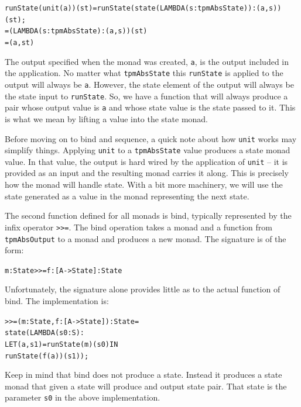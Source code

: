 \documentclass[10pt]{article}
\begin{document}
\begin{alltt}
  runState(unit(a))(st) = runState(state(LAMBDA (s:tpmAbsState)) :  (a,s))(st);
                        = (LAMBDA (s:tpmAbsState) : (a,s))(st)
                        = (a,st)
\end{alltt}

The output specified when the monad was created, \verb!a!, is the
output included in the application.  No matter what \verb!tpmAbsState!
this \verb!runState! is applied to the output will always be
\verb!a!.  However, the state element of the output will always be the
state input to \verb!runState!.  So, we have a function that will
always produce a pair whose output value is \verb!a! and whose state
value is the state passed to it.  This is what we mean by lifting a
value into the state monad.


Before moving on to bind and sequence, a quick note about how
\verb!unit! works may simplify things.  Applying \verb!unit! to a
\verb!tpmAbsState! value produces a state monad value.  In that value,
the output is hard wired by the application of \verb!unit! -- it is
provided as an input and the resulting monad carries it along.  This
is precisely how the monad will handle state.  With a bit more
machinery, we will use the state generated as a value in the monad
representing the next state.

The second function defined for all monads is bind, typically
represented by the infix operator \verb!>>=!.  The bind operation
takes a monad and a function from \verb!tpmAbsOutput! to a monad and
produces a new monad.  The signature is of the form:

\begin{alltt}
  m:State >>= f:[A->State] : State
\end{alltt}

Unfortunately, the signature alone provides little as to the actual
function of bind.  The implementation is:

\begin{alltt}
 >>= (m:State,f:[A->State]):State =
   state(LAMBDA(s0:S):
          LET (a,s1) = runState(m)(s0) IN 
	    runState(f(a))(s1));
\end{alltt}

Keep in mind that bind does not produce a state.  Instead it produces
a state monad that given a state will produce and output state pair.
That state is the parameter \verb!s0! in the above implementation.
\end{document}
